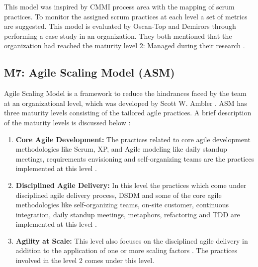 \documentclass[a4paper,oneside]{bth}
\begin{document}
This model was inspired by CMMI process area with the mapping of scrum practices. To monitor the assigned scrum practices at each level a set of metrics are suggested. This model is evaluated by Oscan-Top and Demirors through performing a case study in an organization. They both mentioned that the organization had reached the maturity level 2: Managed during their research \cite{ozcan-top_assessment_2013}.
\subsection{M7: Agile Scaling Model (ASM)}
Agile Scaling Model is a framework to reduce the hindrances faced by the team at an organizational level, which was developed by Scott W. Ambler \cite{ambler_agile_2009}. ASM has three maturity levels consisting of the tailored agile practices. A brief description of the maturity levels is discussed below \cite{ambler_agile_2009}:
\begin{enumerate}
\item \textbf{Core Agile Development:} The practices related to core agile development methodologies like Scrum, XP, and Agile modeling like daily standup meetings, requirements envisioning and self-organizing teams are the practices implemented at this level \cite{ambler_agile_2009}.
\item	\textbf{Disciplined Agile Delivery:} In this level the practices which come under disciplined agile delivery process, DSDM and some of the core agile methodologies like self-organizing teams, on-site customer, continuous integration, daily standup meetings, metaphors, refactoring and TDD are implemented at this level \cite{ambler_agile_2009}.
\item	\textbf{Agility at Scale:} This level also focuses on the disciplined agile delivery in addition to the application of one or more scaling factors \cite{ambler_agile_2009}. The practices involved in the level 2 comes under this level.
\end{enumerate}
\end{document}
